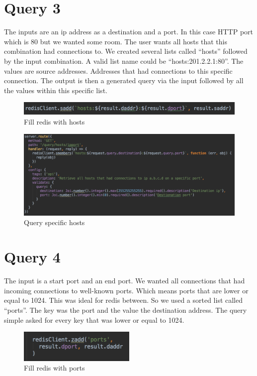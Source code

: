 \section{Query 3}
The inputs are an ip address as a destination and a port. In this case HTTP port which is 80 but we wanted some room. The user wants all hosts that this combination had connections to. We created several lists called “hosts” followed by the input combination. A valid list name could be “hosts:201.2.2.1:80”. The values are source addresses. Addresses that had connections to this specific connection. The output is then a generated query via the input followed by all the values within this specific list.

  \begin{figure}[H]
	\centerline{\includegraphics[width=1.0\textwidth]{resources/solution2-6.png}}
	\caption{Fill redis with hosts}
	\label{query3}
\end{figure}

\begin{figure}[H]
	\centerline{\includegraphics[width=1.0\textwidth]{resources/solution2-7.png}}
	\caption{Query specific hosts}
	\label{query33}
\end{figure}

\section{Query 4}
The input is a start port and an end port. We wanted all connections that had incoming connections to well-known ports. Which means ports that are lower or equal to 1024. This was ideal for redis between. So we used a sorted list called “ports”. The key was the port and the value the destination address. The query simple asked for every key that was lower or equal to 1024.

  \begin{figure}[H]
	\centerline{\includegraphics[width=0.5\textwidth]{resources/solution2-8.png}}
	\caption{Fill redis with ports}
	\label{query4}
\end{figure}

